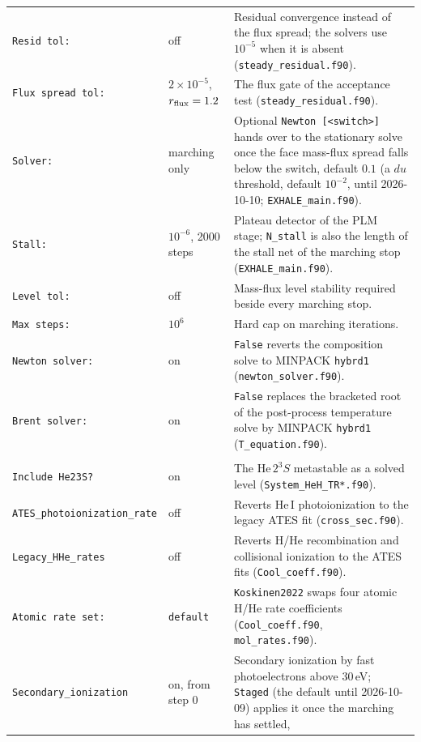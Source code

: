{\begin{longtable}{@{}>{\raggedright\arraybackslash}p{}>{\raggedright\arraybackslash}p{}>{\raggedright\arraybackslash}p{}@{}}
\texttt{Resid tol:} & off &
  Residual convergence instead of the flux spread; the solvers use $10^{-5}$
  when it is absent (\texttt{steady\_residual.f90}). \\
\texttt{Flux spread tol:} & $2\times10^{-5}$, $r_{\rm flux}=1.2$ &
  The flux gate of the acceptance test
  (\texttt{steady\_residual.f90}). \\
\texttt{Solver:} & marching only &
  Optional \texttt{Newton [<switch>]} hands over to the stationary solve once the
  face mass-flux spread falls below the switch, default $0.1$ (a $du$
  threshold, default $10^{-2}$, until 2026-10-10; \texttt{EXHALE\_main.f90}). \\
\texttt{Stall:} & $10^{-6}$, 2000 steps &
  Plateau detector of the PLM stage; \texttt{N\_stall} is also the length of
  the stall net of the marching stop (\texttt{EXHALE\_main.f90}). \\
\texttt{Level tol:} & off &
  Mass-flux level stability required beside every marching stop. \\
\texttt{Max steps:} & $10^{6}$ &
  Hard cap on marching iterations. \\
\texttt{Newton solver:} & on &
  \texttt{False} reverts the composition solve to MINPACK \texttt{hybrd1}
  (\texttt{newton\_solver.f90}). \\
\texttt{Brent solver:} & on &
  \texttt{False} replaces the bracketed root of the post-process temperature
  solve by MINPACK \texttt{hybrd1} (\texttt{T\_equation.f90}). \\
\midrule
\multicolumn{3}{l}{\itshape Atomic hydrogen and helium}\\
\midrule
\texttt{Include He23S?} & on &
  The $\mathrm{He}\,2^3S$ metastable as a solved level
  (\texttt{System\_HeH\_TR*.f90}). \\
\texttt{ATES\_photoionization\_rate} & off &
  Reverts He\,I photoionization to the legacy ATES fit
  (\texttt{cross\_sec.f90}). \\
\texttt{Legacy\_HHe\_rates} & off &
  Reverts H/He recombination and collisional ionization to the ATES fits
  (\texttt{Cool\_coeff.f90}). \\
\texttt{Atomic rate set:} & \texttt{default} &
  \texttt{Koskinen2022} swaps four atomic H/He rate coefficients
  (\texttt{Cool\_coeff.f90}, \texttt{mol\_rates.f90}). \\
\texttt{Secondary\_ionization} & on, from step 0 &
  Secondary ionization by fast photoelectrons above 30\,eV; \texttt{Staged}
  (the default until 2026-10-09) applies it once the marching has settled,

\end{longtable}}
